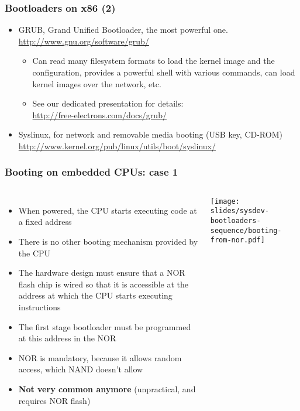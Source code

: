 \begin{frame}
  \frametitle{Bootloaders on x86 (2)}
  \begin{itemize}
  \item GRUB, Grand Unified Bootloader, the most powerful one.\\
    \url{http://www.gnu.org/software/grub/}
    \begin{itemize}
    \item Can read many filesystem formats to load the kernel image
      and the configuration, provides a powerful shell with various
      commands, can load kernel images over the network, etc.
    \item See our dedicated presentation for details:\\
      \url{http://free-electrons.com/docs/grub/}
    \end{itemize}
  \item Syslinux, for network and removable media booting (USB key, CD-ROM)\\
    \small\url{http://www.kernel.org/pub/linux/utils/boot/syslinux/}\normalsize
  \end{itemize}
\end{frame}

\begin{frame}
  \frametitle{Booting on embedded CPUs: case 1}
  \begin{columns}
    \begin{itemize}
    \item When powered, the CPU starts executing code at a fixed address
    \item There is no other booting mechanism provided by the CPU
    \item The hardware design must ensure that a NOR flash chip is
      wired so that it is accessible at the address at which the CPU
      starts executing instructions
    \item The first stage bootloader must be programmed at this
      address in the NOR
    \item NOR is mandatory, because it allows random access, which
      NAND doesn't allow
    \item {\bf Not very common anymore} (unpractical, and requires NOR
      flash)
    \end{itemize}
    \texttt{[image: slides/sysdev-bootloaders-sequence/booting-from-nor.pdf]}
  \end{columns}
\end{frame}

